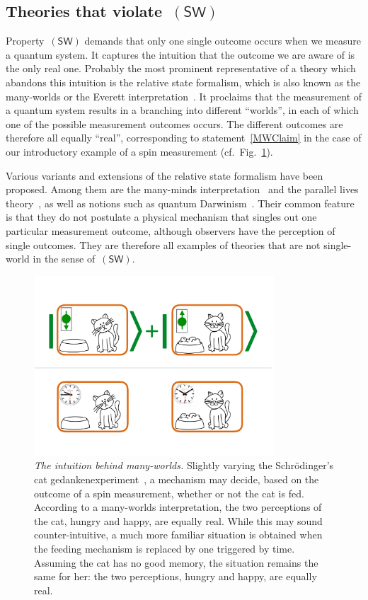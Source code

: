 \documentclass[12pt]{article}
\theoremstyle{plain}
\theoremstyle{definition}
\newcommand*{\SW}{\mathsf{(SW)}}
\begin{document}
\subsection{Theories that violate~$\SW$} \label{sec_vSW}

Property~$\SW$ demands that only one single outcome occurs when we measure a quantum system. It captures the intuition that the outcome we are aware of is the only real one. Probably the most prominent representative of a theory which abandons this intuition is the relative state formalism, which is also known as the many-worlds or the Everett interpretation~\cite{Everett57,Wheeler57,DeWitt70,Deutsch85,Deutsch97,Vaidman16}. It proclaims that  the measurement of a quantum system results in a branching into different ``worlds'', in each of which one of the possible measurement outcomes occurs. The different outcomes are therefore all equally ``real'', corresponding to statement~\eqref{MWClaim} in the case of our introductory example of a spin measurement (cf.\ Fig.~\ref{fig_MW}). 

Various variants and extensions of the relative state formalism have been proposed. Among them are the many-minds interpretation~\cite{Zeh70, AlbLoe88} and the parallel lives theory~\cite{Brassard13}, as well as notions such as quantum Darwinism~\cite{Zurek07}. Their common feature is that they do not postulate a physical mechanism that singles out one particular measurement outcome, although observers have the perception of single outcomes. They are therefore all examples of theories that are not single-world in the sense of~$\SW$. 

\begin{figure}[t]
\centering
\includegraphics[trim= 0.4cm  0.2cm 1cm 4cm, clip=true, width=0.8\textwidth]{ManyWorldsTime.pdf}
\caption{\emph{The intuition behind many-worlds.}   Slightly varying the Schr\"odinger's cat gedankenexperiment~\cite{Schroedinger35},  a mechanism may decide, based on the outcome of a spin measurement, whether or not the cat is fed. According to a many-worlds interpretation, the two perceptions of the cat, hungry and happy, are equally real. While this may sound counter-intuitive, a much more familiar situation is obtained when the feeding mechanism is replaced by one triggered by time.  Assuming the cat has no good memory, the situation remains the same for her: the two perceptions, hungry and happy, are equally real.
\label{fig_MW}
}
\end{figure}
\end{document}
